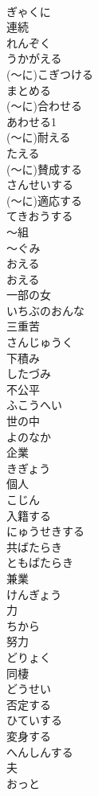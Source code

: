 \documentclass[8pt]{extreport}
\begin{document}
\begin{CJK}{UTF8}{min}
\\	ぎゃくに
\\	連続	
\\	れんぞく
\\	うかがえる	
\\	(～に)こぎつける	
\\	まとめる	
\\	(～に)合わせる	
\\	あわせる1
\\	(～に)耐える	
\\	たえる
\\	(～に)賛成する	
\\	さんせいする
\\	(～に)適応する	
\\	てきおうする
\\	～組	
\\	～ぐみ
\\	おえる	
\\	おえる
\\	一部の女	
\\	いちぶのおんな
\\	三重苦	
\\	さんじゅうく
\\	下積み	
\\	したづみ
\\	不公平	
\\	ふこうへい
\\	世の中	
\\	よのなか
\\	企業	
\\	きぎょう
\\	個人	
\\	こじん
\\	入籍する	
\\	にゅうせきする
\\	共ばたらき	
\\	ともばたらき
\\	兼業	
\\	けんぎょう
\\	力	
\\	ちから
\\	努力	
\\	どりょく
\\	同棲	
\\	どうせい
\\	否定する	
\\	ひていする
\\	変身する	
\\	へんしんする
\\	夫	
\\	おっと

\end{CJK}
\end{document}
